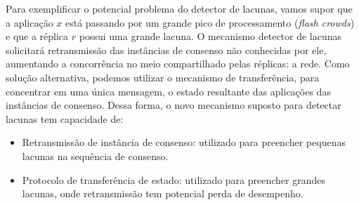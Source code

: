 Para exemplificar o potencial problema do detector de lacunas, vamos supor que a aplicação
$x$ está passando por um grande pico de processamento (\emph{flash crowds}) e que a
réplica $r$ possui uma grande lacuna. O mecanismo detector de lacunas solicitará
retransmissão das instâncias de consenso não conhecidas por ele, aumentando a concorrência
no meio compartilhado pelas réplicas: a rede. Como solução alternativa, podemos utilizar o
mecanismo de transferência, para concentrar em uma única mensagem, o estado resultante das
aplicações das instâncias de consenso. Dessa forma, o novo mecanismo suposto para detectar
lacunas tem capacidade de:

\begin{itemize}
  \item Retransmissão de instância de consenso: utilizado para preencher pequenas lacunas
    na sequência de consenso.
  \item Protocolo de transferência de estado: utilizado para preencher grandes lacunas,
    onde retransmissão tem potencial perda de desempenho.
\end{itemize}

